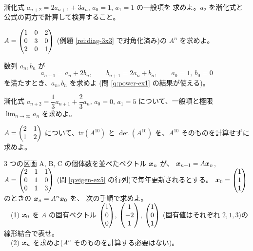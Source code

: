 \begin{mondai}[基本]\label{q:power-ex4}
漸化式 $a_{n+2} = 2a_{n+1} + 3a_n$, $a_0 = 1$, $a_1 = 1$ の一般項を
求めよ。$a_2$ を漸化式と公式の両方で計算して検算すること。
\end{mondai}

\begin{mondai}[標準]\label{q:power-ex5}
$A = \begin{pmatrix}1 & 0 & 2 \\ 0 & 3 & 0 \\ 2 & 0 & 1\end{pmatrix}$
(例題 \ref{rei:diag-3x3} で対角化済み)の $A^n$ を求めよ。
\end{mondai}

\begin{mondai}[標準]\label{q:power-ex6}
数列 $a_n, b_n$ が
\[
a_{n+1} = a_n + 2b_n, \qquad b_{n+1} = 2a_n + b_n, \qquad
a_0 = 1,\ b_0 = 0
\]
を満たすとき、$a_n, b_n$ を求めよ
(問 \ref{q:power-ex1} の結果が使える)。
\end{mondai}

\begin{mondai}[標準]\label{q:power-ex7}
漸化式 $a_{n+2} = \dfrac{1}{3}a_{n+1} + \dfrac{2}{3}a_n$,
$a_0 = 0$, $a_1 = 5$ について、一般項と極限
$\displaystyle\lim_{n\to\infty} a_n$ を求めよ。
\end{mondai}

\begin{mondai}[標準]\label{q:power-ex8}
$A = \begin{pmatrix}2 & 1 \\ 1 & 2\end{pmatrix}$ について、$\mathrm{tr}(A^{10})$ と
$\det(A^{10})$ を、$A^{10}$ そのものを計算せずに求めよ。
\end{mondai}

\begin{mondai}[標準]\label{q:power-ex13}
$3$ つの区画 A, B, C の個体数を並べたベクトル $\bm{x}_n$ が、
$\bm{x}_{n+1} = A\bm{x}_n$,
$A = \begin{pmatrix}2 & 1 & 1 \\ 0 & 1 & 0 \\ 0 & 1 & 3\end{pmatrix}$
(問 \ref{q:eigen-ex5} の行列)で毎年更新されるとする。
$\bm{x}_0 = \begin{pmatrix}1 \\ 1 \\ 1\end{pmatrix}$ のときの $\bm{x}_n = A^n\bm{x}_0$ を、
次の手順で求めよ。\\
　(1) $\bm{x}_0$ を $A$ の固有ベクトル
$\begin{pmatrix}1 \\ 0 \\ 0\end{pmatrix}$, $\begin{pmatrix}1 \\ -2 \\ 1\end{pmatrix}$, $\begin{pmatrix}1 \\ 0 \\ 1\end{pmatrix}$
(固有値はそれぞれ $2, 1, 3$)の線形結合で表せ。\\
　(2) $\bm{x}_n$ を求めよ($A^n$ そのものを計算する必要はない)。
\end{mondai}

